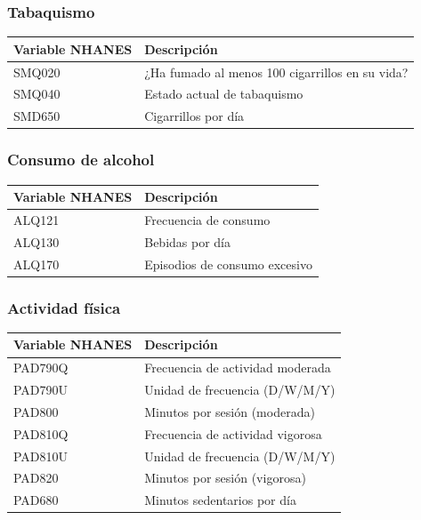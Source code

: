 \documentclass[12pt, a4paper]{report}
\begin{document}
\subsubsection{Tabaquismo}

\begin{table}[H]
\centering
\begin{tabular}{ll}
\toprule
\textbf{Variable NHANES} & \textbf{Descripción} \\
\midrule
SMQ020 & ¿Ha fumado al menos 100 cigarrillos en su vida? \\
SMQ040 & Estado actual de tabaquismo \\
SMD650 & Cigarrillos por día \\
\bottomrule
\end{tabular}
\end{table}

\subsubsection{Consumo de alcohol}

\begin{table}[H]
\centering
\begin{tabular}{ll}
\toprule
\textbf{Variable NHANES} & \textbf{Descripción} \\
\midrule
ALQ121 & Frecuencia de consumo \\
ALQ130 & Bebidas por día \\
ALQ170 & Episodios de consumo excesivo \\
\bottomrule
\end{tabular}
\end{table}

\subsubsection{Actividad física}

\begin{table}[H]
\centering
\begin{tabular}{ll}
\toprule
\textbf{Variable NHANES} & \textbf{Descripción} \\
\midrule
PAD790Q & Frecuencia de actividad moderada \\
PAD790U & Unidad de frecuencia (D/W/M/Y) \\
PAD800 & Minutos por sesión (moderada) \\
PAD810Q & Frecuencia de actividad vigorosa \\
PAD810U & Unidad de frecuencia (D/W/M/Y) \\
PAD820 & Minutos por sesión (vigorosa) \\
PAD680 & Minutos sedentarios por día \\
\bottomrule
\end{tabular}
\end{table}
\end{document}
